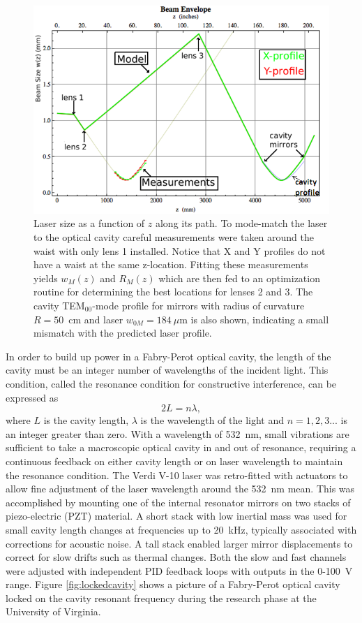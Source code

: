 \begin{figure}[h]
\begin{center}
\includegraphics[width=5in]{./Pictures/HallC_mode_match_cavity_profile.PNG}
\end{center}
\caption{\label{fig:mode_match}Laser size as a function of $z$ along its path. To mode-match the laser to the optical cavity careful measurements were taken around the waist with only lens 1 installed. Notice that X and Y profiles do not have a waist at the same z-location. Fitting these measurements yields $w_M(z)$ and $R_M(z)$ which are then fed to an optimization routine for determining the best locations for lenses 2 and 3. The cavity TEM$_{00}$-mode profile for mirrors with radius of curvature $R=50$~cm and laser $w_{0M}=184~\mu$m is also shown, indicating a small mismatch with the predicted laser profile. }
\end{figure}
 
In order to build up power in a Fabry-Perot optical cavity, the length of the cavity must be an integer number of wavelengths of the incident light. This condition, called the resonance condition for constructive interference, can be expressed as
\[
 2L=n\lambda,
\]
where $L$ is the cavity length, $\lambda$ is the wavelength of the light and $n=1,2,3...$ is an integer greater than zero. With a wavelength of 532~nm, small vibrations are sufficient to take a macroscopic optical cavity in and out of resonance, requiring a continuous feedback on either cavity length or on laser wavelength to maintain the resonance condition. The Verdi V-10 laser was retro-fitted with actuators to allow fine adjustment of the laser wavelength around the 532~nm mean. This was accomplished by mounting one of the internal resonator mirrors on two stacks of piezo-electric (PZT) material\cite{Coherent}. A short stack with low inertial mass was used for small cavity length changes at frequencies up to 20~kHz, typically associated with corrections for acoustic noise. A tall stack enabled larger mirror displacements to correct for slow drifts such as thermal changes. Both the slow and fast channels were adjusted with independent PID feedback loops with outputs in the 0-100~V range. Figure \ref{fig:lockedcavity} shows a picture of a Fabry-Perot optical cavity locked on the cavity resonant frequency during the research phase at the University of Virginia.

